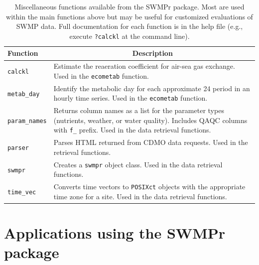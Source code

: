\begin{table}[!tbp]
\caption{Miscellaneous functions available from the SWMPr package.  Most are used within the main functions above but may be useful for customized evaluations of SWMP data.  Full documentation for each function is in the help file (e.g., execute \texttt{?calckl} at the command line).\label{tab:misc}} 
\begin{center}
\begin{tabular}{lp{3.5in}}
\hline\hline
\multicolumn{1}{l}{Function}&\multicolumn{1}{c}{Description}\tabularnewline
\hline
\texttt{calckl}&Estimate the reaeration coefficient for air-sea gas exchange.  Used in the \texttt{ecometab} function.\tabularnewline
\texttt{metab\_day}&Identify the metabolic day for each approximate 24 period in an hourly time series.  Used in the \texttt{ecometab} function.\tabularnewline
\texttt{param\_names}&Returns column names as a list for the parameter types (nutrients, weather, or water quality).  Includes QAQC columns with \texttt{f\_} prefix. Used in the data retrieval functions.\tabularnewline
\texttt{parser}&Parses HTML returned from CDMO data requests.  Used in the retrieval functions.\tabularnewline
\texttt{swmpr}&Creates a \texttt{swmpr} object class.  Used in the data retrieval functions.\tabularnewline
\texttt{time\_vec}&Converts time vectors to \texttt{POSIXct} objects with the appropriate time zone for a site.  Used in the data retrieval functions.\tabularnewline
\hline
\end{tabular}\end{center}

\end{table}


\section{Applications using the SWMPr package}
\label{swmp_apps}

